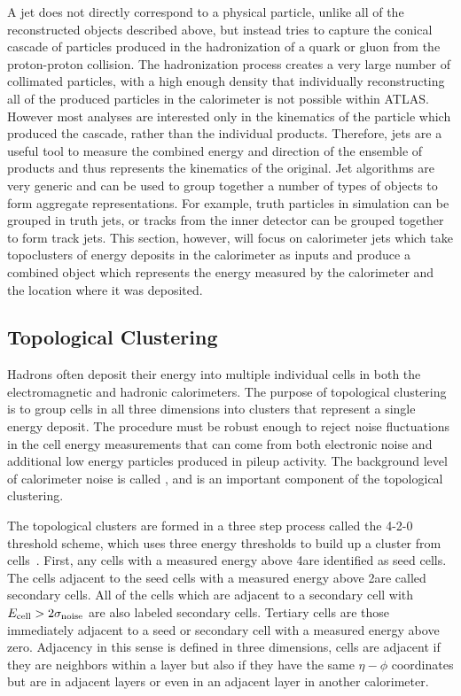 A jet does not directly correspond to a physical particle, unlike all of the reconstructed objects described above, but instead tries to capture the conical cascade of particles produced in the hadronization of a quark or gluon from the proton-proton collision.
The hadronization process creates a very large number of collimated particles, with a high enough density that individually reconstructing all of the produced particles in the calorimeter is not possible within ATLAS.
However most analyses are interested only in the kinematics of the particle which produced the cascade, rather than the individual products.
Therefore, jets are a useful tool to measure the combined energy and direction of the ensemble of products and thus represents the kinematics of the original.
Jet algorithms are very generic and can be used to group together a number of types of objects to form aggregate representations.
For example, truth particles in simulation can be grouped in truth jets, or tracks from the inner detector can be grouped together to form track jets. 
This section, however, will focus on calorimeter jets which take topoclusters of energy deposits in the calorimeter as inputs and produce a combined object which represents the energy measured by the calorimeter and the location where it was deposited.

\subsection{Topological Clustering}

Hadrons often deposit their energy into multiple individual cells in both the electromagnetic and hadronic calorimeters.
The purpose of topological clustering is to group cells in all three dimensions into clusters that represent a single energy deposit.
The procedure must be robust enough to reject noise fluctuations in the cell energy measurements that can come from both electronic noise and additional low energy particles produced in pileup activity.
The background level of calorimeter noise is called \signoise, and is an important component of the topological clustering.

The topological clusters are formed in a three step process called the 4-2-0 threshold scheme, which uses three energy thresholds to build up a cluster from cells~\cite{PERF-2014-07}.
First, any cells with a measured energy above 4\signoise are identified as seed cells. 
The cells adjacent to the seed cells with a measured energy above 2\signoise are called secondary cells.
All of the cells which are adjacent to a secondary cell with $E_\mathrm{cell} > 2\sigma_{\mathrm{noise}}$ are also labeled secondary cells.
Tertiary cells are those immediately adjacent to a seed or secondary cell with a measured energy above zero.
Adjacency in this sense is defined in three dimensions, cells are adjacent if they are neighbors within a layer but also if they have the same $\eta-\phi$ coordinates but are in adjacent layers or even in an adjacent layer in another calorimeter.

